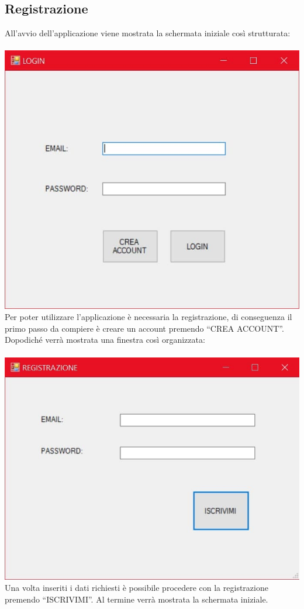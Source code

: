\documentclass[a4paper, titlepage]{article}
\begin{document}
\subsection{Registrazione}
All’avvio dell’applicazione viene mostrata la schermata iniziale così strutturata:\\\\
\includegraphics[scale=0.30]{Immagini/form/Form Login.jpg}
\\Per poter utilizzare l’applicazione è necessaria la registrazione, di conseguenza il primo passo da compiere è creare un account premendo “CREA ACCOUNT”. Dopodiché verrà mostrata una finestra così organizzata:\\\\
\includegraphics[scale=0.30]{Immagini/form/Form Registrazione.jpg}
\\Una volta inseriti i dati richiesti è possibile procedere con la registrazione premendo “ISCRIVIMI”. Al termine verrà mostrata la schermata iniziale.
\end{document}
